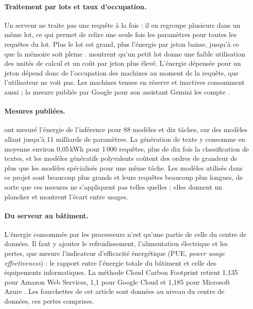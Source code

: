 \documentclass[11pt,a4paper]{article}
\begin{document}
\paragraph{Traitement par lots et taux d'occupation.} Un serveur ne traite pas une requête à la fois : il en regroupe plusieurs dans un même lot, ce qui permet de relire une seule fois les paramètres pour toutes les requêtes du lot. Plus le lot est grand, plus l'énergie par jeton baisse, jusqu'à ce que la mémoire soit pleine \citep{patel2024}. \citet{pope2023} montrent qu'un petit lot donne une faible utilisation des unités de calcul et un coût par jeton plus élevé. L'énergie dépensée pour un jeton dépend donc de l'occupation des machines au moment de la requête, que l'utilisateur ne voit pas. Les machines tenues en réserve et inactives consomment aussi ; la mesure publiée par Google pour son assistant Gemini les compte \citep{elsworth2025}.

\paragraph{Mesures publiées.} \citet{luccioni2024} ont mesuré l'énergie de l'inférence pour 88 modèles et dix tâches, sur des modèles allant jusqu'à 11 milliards de paramètres. La génération de texte y consomme en moyenne environ 0,05\,kWh pour 1\,000 requêtes, plus de dix fois la classification de textes, et les modèles génératifs polyvalents coûtent des ordres de grandeur de plus que les modèles spécialisés pour une même tâche. Les modèles utilisés dans ce projet sont beaucoup plus grands et leurs requêtes beaucoup plus longues, de sorte que ces mesures ne s'appliquent pas telles quelles ; elles donnent un plancher et montrent l'écart entre usages.

\paragraph{Du serveur au bâtiment.} L'énergie consommée par les processeurs n'est qu'une partie de celle du centre de données. Il faut y ajouter le refroidissement, l'alimentation électrique et les pertes, que mesure l'indicateur d'efficacité énergétique (PUE, \emph{power usage effectiveness}) : le rapport entre l'énergie totale du bâtiment et celle des équipements informatiques. La méthode Cloud Carbon Footprint retient 1,135 pour Amazon Web Services, 1,1 pour Google Cloud et 1,185 pour Microsoft Azure \citep{ccf}. Les fourchettes de cet article sont données au niveau du centre de données, ces pertes comprises.
\end{document}
